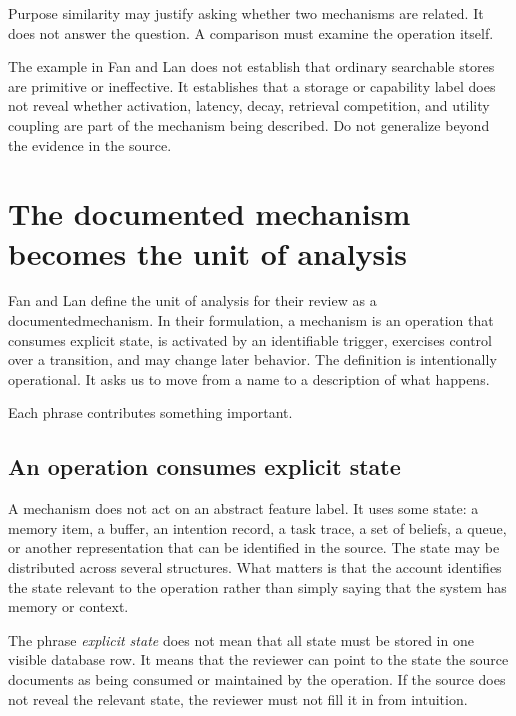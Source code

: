 Purpose similarity may justify asking whether two mechanisms are related. It does not answer the question. A comparison must examine the operation itself.

\begin{notebox}
The example in Fan and Lan does not establish that ordinary searchable stores are primitive or ineffective. It establishes that a storage or capability label does not reveal whether activation, latency, decay, retrieval competition, and utility coupling are part of the mechanism being described. Do not generalize beyond the evidence in the source.
\end{notebox}

\section{The documented mechanism becomes the unit of analysis}
\label{sec:documented-mechanism-unit}

Fan and Lan define the unit of analysis for their review as a \gls{documentedmechanism}. In their formulation, a mechanism is an operation that consumes explicit state, is activated by an identifiable trigger, exercises control over a transition, and may change later behavior. The definition is intentionally operational. It asks us to move from a name to a description of what happens.

Each phrase contributes something important.

\subsection{An operation consumes explicit state}

A mechanism does not act on an abstract feature label. It uses some state: a memory item, a buffer, an intention record, a task trace, a set of beliefs, a queue, or another representation that can be identified in the source. The state may be distributed across several structures. What matters is that the account identifies the state relevant to the operation rather than simply saying that the system has memory or context.

The phrase \emph{explicit state} does not mean that all state must be stored in one visible database row. It means that the reviewer can point to the state the source documents as being consumed or maintained by the operation. If the source does not reveal the relevant state, the reviewer must not fill it in from intuition.

